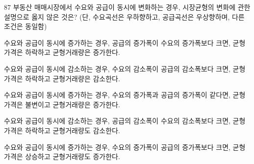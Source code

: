 \begin{question}{87}
부동산 매매시장에서 수요와 공급이 동시에 변화하는 경우, 시장균형의 변화에 관한 설명으로 옳지 않은 것은? (단, 수요곡선은 우하향하고, 공급곡선은 우상향하며, 다른 조건은 동일함)
\begin{choices}
  \item 수요와 공급이 동시에 증가하는 경우, 공급의 증가폭이 수요의 증가폭보다 크면, 균형 가격은 하락하고 균형거래량은 증가한다.
  \item 수요와 공급이 동시에 감소하는 경우, 수요의 감소폭이 공급의 감소폭보다 크면, 균형 가격은 하락하고 균형거래량은 감소한다.
  \item 수요와 공급이 동시에 증가하는 경우, 수요의 증가폭과 공급의 증가폭이 같다면, 균형 가격은 불변이고 균형거래량은 증가한다.
  \item 수요와 공급이 동시에 감소하는 경우, 공급의 감소폭이 수요의 감소폭보다 크면, 균형 가격은 하락하고 균형거래량도 감소한다.
  \item 수요와 공급이 동시에 증가하는 경우, 수요의 증가폭이 공급의 증가폭보다 크면, 균형 가격은 상승하고 균형거래량도 증가한다.
\end{choices}
\end{question}
